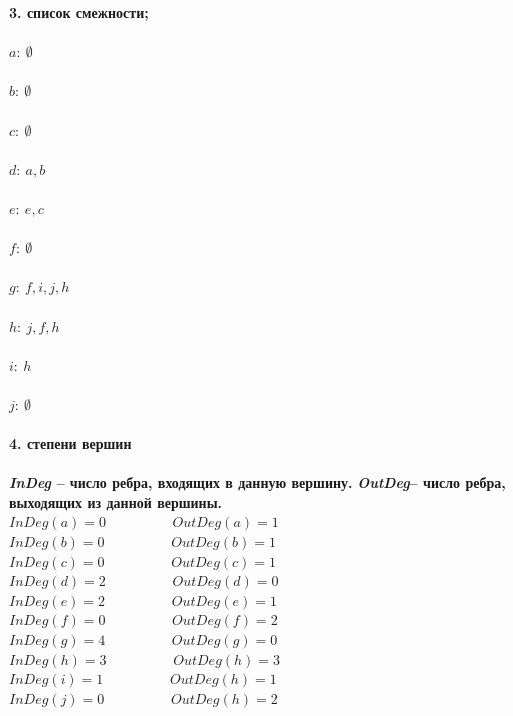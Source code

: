 \documentclass{article}
\begin{document}
\Large{\textbf{3. список смежности;}}\\ \\
\Large{\textbf{$a: \  \emptyset$}}\\ \\
\Large{\textbf{$b: \ \emptyset$}}\\ \\
\Large{\textbf{$c: \  \emptyset$}}\\ \\
\Large{\textbf{$d: \ a, b$}}\\ \\
\Large{\textbf{$e: \ e, c $}}\\ \\
\Large{\textbf{$f: \ \emptyset$}}\\ \\
\Large{\textbf{$g: \ f, i, j, h$}}\\ \\
\Large{\textbf{$h: \ j, f, h$}}\\ \\
\Large{\textbf{$i: \ h$}}\\ \\
\Large{\textbf{$j: \ \emptyset$}}\\\\

\Large{\textbf{4. степени вершин}}\\\\
\large\textbf{\textit{InDeg }– число ребра, входящих в данную вершину.}\newline
\large\textbf{\textit{OutDeg}– число ребра, выходящих из данной вершины.}\newline
\\
\Large{\textbf{$InDeg(a) = 0 \hspace{2cm} OutDeg(a) = 1 $}}\\
\Large{\textbf{$InDeg(b) = 0 \hspace{2cm} OutDeg(b) = 1 $}}\\
\Large{\textbf{$InDeg(c) = 0 \hspace{2cm} OutDeg(c) = 1 $}}\\
\Large{\textbf{$InDeg(d) = 2 \hspace{2cm} OutDeg(d) = 0 $}}\\
\Large{\textbf{$InDeg(e) = 2 \hspace{2cm} OutDeg(e) = 1 $}}\\
\Large{\textbf{$InDeg(f) = 0 \hspace{2cm} OutDeg(f) = 2 $}}\\
\Large{\textbf{$InDeg(g) = 4 \hspace{2cm} OutDeg(g) = 0 $}}\\
\Large{\textbf{$InDeg(h) = 3 \hspace{2cm} OutDeg(h) = 3 $}}\\
\Large{\textbf{$InDeg(i) = 1 \hspace{2cm} OutDeg(h) = 1 $}}\\
\Large{\textbf{$InDeg(j) = 0 \hspace{2cm} OutDeg(h) = 2 $}}\\\\
\end{document}
